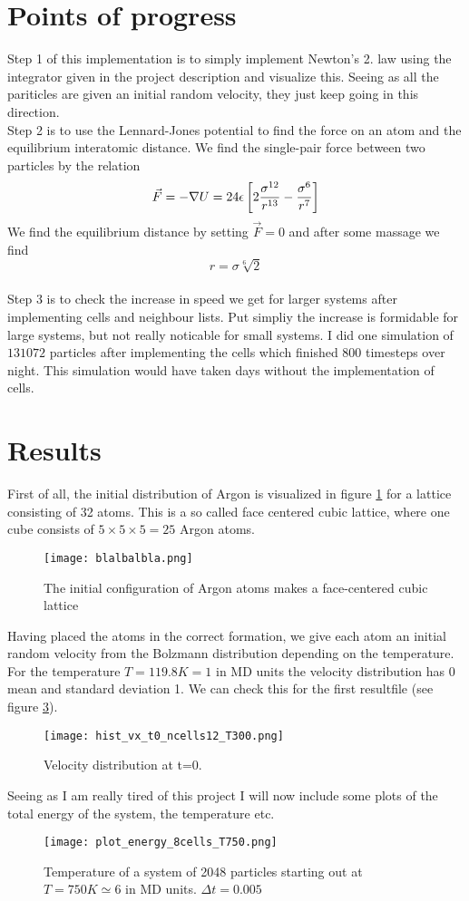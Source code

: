 \documentclass[a4paper,english, 10pt, twoside]{article}
\begin{document}
\section{Points of progress}
Step 1 of this implementation is to simply implement Newton's 2. law using the integrator 
given in the project description and visualize this. Seeing as all the pariticles are given 
an initial random velocity, they just keep going in this direction.\\
Step 2 is to use the Lennard-Jones potential to find the force on an atom and the equilibrium 
interatomic distance. We find the single-pair force between two particles by the relation 
$$
\vec{F} = -\nabla U = 24\epsilon\left[2{\sigma^{12}\over r^{13}} - {\sigma^6\over r^7}\right]
$$
We find the equilibrium distance by setting $\vec{F} = 0$ and after some massage we find 
$$
r = \sigma\sqrt[6]{2}
$$\\
Step 3 is to check the increase in speed we get for larger systems after implementing cells 
and neighbour lists. Put simpliy the increase is formidable for large systems, but not really 
noticable for small systems. I did one simulation of $131072$ particles after implementing 
the cells which finished 800 timesteps over night. This simulation would have taken days 
without the implementation of cells.
\section{Results}
First of all, the initial distribution of Argon is visualized in figure \ref{first} for a lattice 
consisting of 32 atoms. This 
is a so called face centered cubic lattice, where one cube consists of $5\times5\times5 = 25$ 
Argon atoms.
\begin{figure}[H]
\centering
\texttt{[image: blalbalbla.png]}
\caption{The initial configuration of Argon atoms makes a face-centered cubic lattice }
\label{first}
\end{figure} 

Having placed the atoms in the correct formation, we give each atom an initial random velocity 
from the Bolzmann distribution depending on the temperature. \\
For the temperature $T = 119.8K = 1$ in MD units the velocity distribution has 0 mean and 
standard deviation 1. We can check this for the first resultfile (see figure \ref{distribution}).
\begin{figure}[H]
\centering
\texttt{[image: hist\_vx\_t0\_ncells12\_T300.png]}
\caption{Velocity distribution at t=0.}
\label{distribution}
\end{figure}
Seeing as I am really tired of this project I will now include some plots of the total energy 
of the system, the temperature etc.
\begin{figure}[H]
\centering
\texttt{[image: plot\_energy\_8cells\_T750.png]}
\caption{Temperature of a system of 2048 particles starting out at $T=750K \simeq 6$ in MD 
units. $\Delta t = 0.005$}
\label{distribution}
\end{figure}
\end{document}
